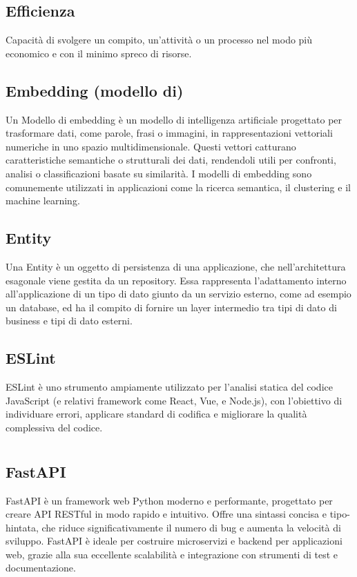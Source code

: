 \hypertarget{sec:efficienza}{}
\subsection*{Efficienza}
Capacità di svolgere un compito, un'attività o un processo nel modo più economico e con il minimo spreco di risorse.

\hypertarget{sec:embedding}{}
\subsection*{Embedding (modello di)}
Un Modello di embedding è un modello di intelligenza artificiale progettato per trasformare dati, come parole, frasi o immagini, in rappresentazioni 
vettoriali numeriche in uno spazio multidimensionale. Questi vettori catturano caratteristiche semantiche o strutturali dei dati, rendendoli utili per 
confronti, analisi o classificazioni basate su similarità. I modelli di embedding sono comunemente utilizzati in applicazioni come la ricerca semantica, 
il clustering e il machine learning.

\hypertarget{sec:entity}{}
\subsection*{Entity}
Una Entity è un oggetto di persistenza di una applicazione, che nell'architettura esagonale viene gestita da un repository.
Essa rappresenta l'adattamento interno all'applicazione di un tipo di dato giunto da un servizio esterno, come ad esempio un database,
ed ha il compito di fornire un layer intermedio tra tipi di dato di business e tipi di dato esterni.

\hypertarget{sec:eslint}{}
\subsection*{ESLint}
ESLint è uno strumento ampiamente utilizzato per l'analisi statica del codice JavaScript (e relativi framework come React, Vue, e Node.js), 
con l'obiettivo di individuare errori, applicare standard di codifica e migliorare la qualità complessiva del codice.
\newpage



\section{}

\hypertarget{sec:fastapi}{}
\subsection*{FastAPI}
FastAPI è un framework web Python moderno e performante, progettato per creare API RESTful in modo rapido e intuitivo. Offre una sintassi 
concisa e tipo-hintata, che riduce significativamente il numero di bug e aumenta la velocità di sviluppo. FastAPI è ideale per 
costruire microservizi e backend per applicazioni web, grazie alla sua eccellente scalabilità e integrazione con strumenti di 
test e documentazione.

